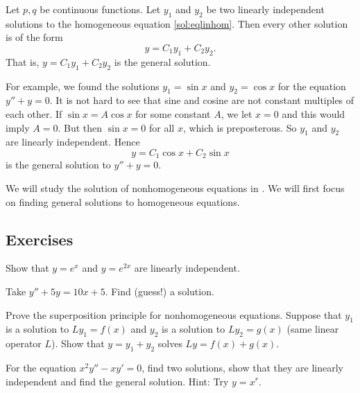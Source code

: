 \documentclass[12pt]{book}
\begin{document}
\begin{theorem}
Let $p, q$ be continuous functions.
Let $y_1$ and $y_2$ be two linearly independent
solutions to the homogeneous equation \eqref{sol:eqlinhom}. 
Then every other solution is 
of the form
\begin{equation*}
y = C_1 y_1 + C_2 y_2 .
\end{equation*}
That is, $y = C_1 y_1 + C_2 y_2$ is the general solution.
\end{theorem}

For example, we found the solutions
$y_1 = \sin x$ and $y_2 = \cos x$ for the
equation $y'' + y = 0$.  It is not hard to see that sine and cosine are not
constant
multiples of each other.  If $\sin x = A \cos x$ for some constant $A$,
we let $x=0$ and this would imply $A = 0$.  But then $\sin x = 0$ for all
$x$, which is preposterous.
So $y_1$ and $y_2$ are linearly independent.  Hence
\begin{equation*}
y = C_1 \cos x + C_2 \sin x 
\end{equation*}
is the general solution to $y'' + y = 0$.

\medskip

We will study the solution of nonhomogeneous equations in
.  We will first focus on finding general solutions to
homogeneous equations.

\subsection{Exercises}

\begin{exercise}
Show that $y=e^x$ and $y=e^{2x}$ are linearly independent.
\end{exercise}

\begin{exercise}
Take $y'' + 5 y = 10 x + 5$.  Find (guess!) a solution.
\end{exercise}

\begin{exercise}
Prove the superposition principle for nonhomogeneous equations.  Suppose that
$y_1$ is a solution to $L y_1 = f(x)$ and $y_2$ is a solution to
$L y_2 = g(x)$ (same linear operator $L$).  Show that $y = y_1+y_2$ solves
$Ly = f(x) + g(x)$.
\end{exercise}

\begin{exercise}
For the equation $x^2 y'' - x y' = 0$, find two solutions, show that they
are linearly independent and find the general solution.
Hint: Try $y = x^r$.
\end{exercise}
\end{document}

